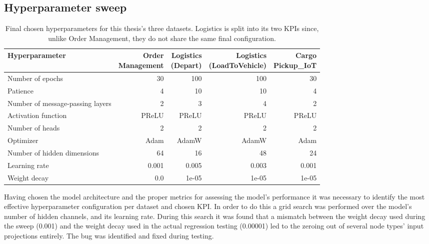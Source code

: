     \subsection{Hyperparameter sweep}
        \begin{table}[t!]
            \centering
            \caption{Final chosen hyperparameters for this thesis's three datasets. Logistics is split into its two KPIs since, unlike Order Management, they do not share the same final configuration.}
            \label{tab:final_hyperparameters}
            \small
            \setlength{\tabcolsep}{4pt}
            \begin{tabular}{lrrrr}
            \toprule
            Hyperparameter & \shortstack{Order\\Management} & \shortstack{Logistics\\(Depart)} & \shortstack{Logistics\\(LoadToVehicle)} & \shortstack{Cargo\\Pickup\_IoT} \\
            \midrule
            Number of epochs & 30 & 100 & 100 & 30 \\
            Patience & 4 & 10 & 10 & 4 \\
            Number of message-passing layers & 2 & 3 & 4 & 2 \\
            Activation function & PReLU & PReLU & PReLU & PReLU \\
            Number of heads & 2 & 2 & 2 & 2 \\
            Optimizer & Adam & AdamW & AdamW & Adam \\
            Number of hidden dimensions & 64 & 16 & 48 & 24 \\
            Learning rate & 0.001 & 0.005 & 0.003 & 0.001 \\
            Weight decay & 0.0 & 1e-05 & 1e-05 & 1e-05 \\
            \bottomrule
            \end{tabular}
            \vspace{2pt}
        \end{table}

        Having chosen the model architecture and the proper metrics for assessing the model's performance it was necessary to identify the most effective hyperparameter configuration per dataset and chosen KPI. In order to do this a grid search was performed over the model's number of hidden channels, and its learning rate. During this search it was found that a mismatch between the weight decay used during the sweep (0.001) and the weight decay used in the actual regression testing (0.00001) led to the zeroing out of several node types' input projections entirely. The bug was identified and fixed during testing.

